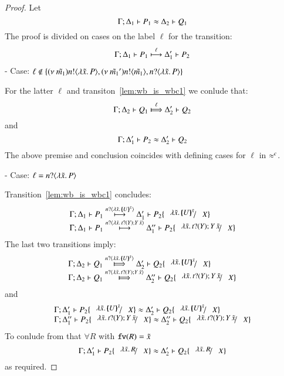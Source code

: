 \begin{proof}
	Let
	\[
		\Gamma; \Delta_1 \vdash P_1 \approx \Delta_2 \vdash Q_1
	\]
	The proof is divided on cases on the label $\ell$ for the transition:
%
	\begin{eqnarray}
		\Gamma; \Delta_1 \vdash P_1 \stackrel{\ell}{\longmapsto} \Delta_1' \vdash P_2
		\label{lem:wb_is_wbc1}
	\end{eqnarray}
%
	\noi - Case: $\ell \notin \{ (\nu\ \tilde{m_1}) n ! \langle \lambda \tilde{x}.\,P \rangle,  (\nu\ \tilde{m_1}') n ! \langle \tilde{m_1} \rangle, n ? \langle \lambda \tilde{x}.\,P \rangle \}$

	\noi For the latter $\ell$ and transiton~\ref{lem:wb_is_wbc1} we conlude that:	
%
	\[
		\horel{\Gamma}{\Delta_2}{Q_1}{\Hby{\ell}}{\Delta_2'}{Q_2}
	\]
%
	\noi and
%
	\[
		\Gamma; \Delta_1' \vdash P_2 \approx \Delta_2' \vdash Q_2
	\]
%
	The above premise and conclusion coincides with defining cases for $\ell$ in $\approx^{c}$.

	\noi - Case: $\ell = n ? \langle \lambda \tilde{x}.\,P \rangle$

	\noi Transition~\ref{lem:wb_is_wbc1} concludes:
%
\[
	\begin{array}{l}
		\horel{\Gamma}{\Delta_1}{P_1}{\hby{\bactinp{n}{\abs{\tilde{x}}{\mapchar{U}{\tilde{x}}}}}}{\Delta_1'}{P_2 \subst{\abs{\tilde{x}}{\mapchar{U}{\tilde{x}}}}{X}}\\
		\horel{\Gamma}{\Delta_1}{P_1}{\hby{\bactinp{n}{\abs{\tilde{x}}{\binp{t}{Y} \appl{Y}{\tilde{x}}}}}}{\Delta_1''}{P_2 \subst{\abs{\tilde{x}}{\binp{t}{Y} \appl{Y}{\tilde{x}}}}{X}}
	\end{array}
\]
%
	\noi The last two transitions imply:
%
\[
	\begin{array}{l}
		\horel{\Gamma}{\Delta_2}{Q_1}{\Hby{\bactinp{n}{\abs{\tilde{x}}{\mapchar{U}{\tilde{x}}}}}}{\Delta_2'}{Q_2 \subst{\abs{\tilde{x}}{\mapchar{U}{\tilde{x}}}}{X}}\\
		\horel{\Gamma}{\Delta_2}{Q_1}{\Hby{\bactinp{n}{\abs{\tilde{x}}{\binp{t}{Y} \appl{Y}{\tilde{x}}}}}}{\Delta_2''}{Q_2 \subst{\abs{\tilde{x}}{\binp{t}{Y} \appl{Y}{\tilde{x}}}}{X}}
	\end{array}
\]
%
	\noi and
%
\[
	\begin{array}{l}
		\horel{\Gamma}{\Delta_1'}{P_2 \subst{\abs{\tilde{x}}{\mapchar{U}{\tilde{x}}}}{X}}{\wb}{\Delta_2'}{Q_2 \subst{\abs{\tilde{x}}{\mapchar{U}{\tilde{x}}}}{X}}\\
		\horel{\Gamma}{\Delta_1''}{P_2 \subst{\abs{\tilde{x}}{\binp{t}{Y} \appl{Y}{\tilde{x}}}}{X}}{\wb}{\Delta_2''}{Q_2 \subst{\abs{\tilde{x}}{\binp{t}{Y} \appl{Y}{\tilde{x}}}}{X}}
	\end{array}
\]
%
	\noi To conlude from  that
	$\forall R$ with $\mathtt{fv}(R) = \tilde{x}$
%
\[
	\horel{\Gamma}{\Delta_1'}{P_2 \subst{\abs{\tilde{x}}{R}}{X}}{\wb}{\Delta_2'}{Q_2 \subst{\abs{\tilde{x}}{R}}{X}}
\]
%
	\noi as required.


\end{proof}
